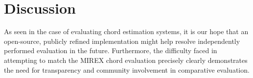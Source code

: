 \documentclass{article}
\begin{document}
\section{Discussion}
\label{sec:discussion}

As seen in the case of evaluating chord estimation systems, it is our hope that an open-source, publicly refined implementation might help resolve independently performed evaluation in the future. 
Furthermore, the difficulty faced in attempting to match the MIREX chord evaluation precisely clearly demonstrates the need for transparency and community involvement in comparative evaluation.


\end{document}
